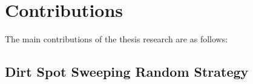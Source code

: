 





\section{Contributions}\label{contributions_1}
The main contributions of the thesis research are as follows: 

\subsection{Dirt Spot Sweeping Random Strategy}

